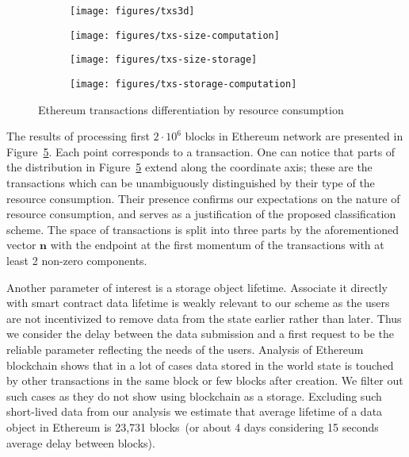 \documentclass[]{llncs}   %
\begin{document}
\begin{figure}[h]
    \centering
    \begin{subfigure}[b]{0.48\textwidth}
        \texttt{[image: figures/txs3d]}
        \caption{}
        \label{fig:a}
    \end{subfigure}
    \begin{subfigure}[b]{0.48\textwidth}
        \texttt{[image: figures/txs-size-computation]}
        \caption{}
        \label{fig:b}
    \end{subfigure}

    \begin{subfigure}[b]{0.48\textwidth}
        \texttt{[image: figures/txs-size-storage]}
        \caption{}
        \label{fig:a}
    \end{subfigure}
    \begin{subfigure}[b]{0.48\textwidth}
        \texttt{[image: figures/txs-storage-computation]}
        \caption{}
        \label{fig:b}
    \end{subfigure}

    \caption{Ethereum transactions differentiation by resource consumption}
    \label{fig:eth}
\end{figure}

The results of processing first $2\cdot10^6$ blocks in Ethereum network are presented in Figure~\ref{fig:eth}.
Each point corresponds to a transaction.
One can notice that parts of the distribution in Figure~\ref{fig:eth} extend
along the coordinate axis; these are the transactions which can be
unambiguously distinguished by their type of the resource consumption. Their
presence confirms our expectations on the nature of resource consumption, and
serves as a justification of the proposed classification scheme. The space of
transactions is split into three parts by the aforementioned vector $\mathbf{n}$
with the endpoint at the first momentum of the transactions with at least 2
non-zero components. %

Another parameter of interest is a storage object lifetime. Associate it directly
with smart contract data lifetime is weakly relevant to our scheme as the users are not incentivized to remove data from the state earlier rather than later. Thus we consider the delay between the data submission and a first request to be the reliable parameter reflecting the needs of the users.
Analysis of Ethereum blockchain shows that in a lot of cases data stored in the world state
is touched by other transactions in the same block or few blocks after creation.
We filter out such cases as they do not show using blockchain as a storage. Excluding such short-lived data from our analysis
we estimate that average lifetime of a data object in Ethereum is 23,731 blocks~(or about 4 days
considering 15 seconds average delay between blocks).
\end{document}
